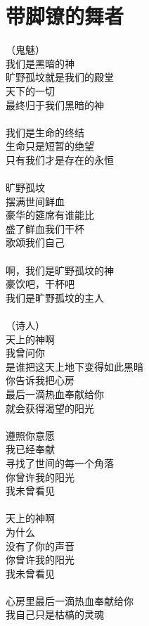 \chapter{带脚镣的舞者}

\leftskip=25mm
\noindent（鬼魅）\\
我们是黑暗的神\\
旷野孤坟就是我们的殿堂\\
天下的一切\\
最终归于我们黑暗的神\\
\\
我们是生命的终结\\
生命只是短暂的绝望\\
只有我们才是存在的永恒\\
\\
旷野孤坟\\
摆满世间鲜血\\
豪华的筵席有谁能比\\
盛了鲜血我们干杯\\
歌颂我们自己\\
\\
啊，我们是旷野孤坟的神\\
豪饮吧，干杯吧\\
我们是旷野孤坟的主人\\
\\
（诗人）\\
天上的神啊\\
我曾问你\\
是谁把这天上地下变得如此黑暗\\
你告诉我把心房\\
最后一滴热血奉献给你\\
就会获得渴望的阳光\\
\\
遵照你意愿\\
我已经奉献\\
寻找了世间的每一个角落\\
你曾许我的阳光\\
我未曾看见\\
\\
天上的神啊\\
为什么\\
没有了你的声音\\
你曾许我的阳光\\
我未曾看见\\
\\
心房里最后一滴热血奉献给你\\
我自己只是枯槁的灵魂\\
